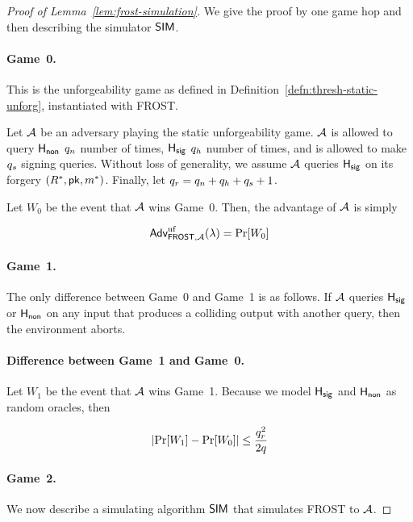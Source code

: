 \begin{proof}[Proof of Lemma~\ref{lem:frost-simulation}]
  We give the proof by one game hop and then describing the simulator $\mathsf{SIM}$.

  \paragraph{Game~0.}
  This is the unforgeability game as defined in Definition~\ref{defn:thresh-static-unforg},
  instantiated with FROST.

  Let $\mathcal{A}$ be an adversary playing the static unforgeability game.
  $\mathcal{A}$ is allowed to query $\mathsf{H_{non}}$ $q_n$ number of times,
  $\mathsf{H_{sig}}$ $q_h$ number of times,
  and is allowed to make $q_s$ signing queries.
  Without loss of generality, we assume $\mathcal{A}$ queries $\mathsf{H_{sig}}$ on its forgery $(R^*, \mathsf{pk}, m^*)$.
  Finally, let $q_r = q_n + q_h + q_s + 1$.

  Let $W_0$ be the event that $\mathcal{A}$ wins Game~0.
  Then, the advantage of $\mathcal{A}$ is simply

  \begin{equation} \label{eq:game0-frost}
    \textsf{\upshape Adv}^{\textrm{\upshape uf}}_{\mathsf{FROST}, \mathcal{A}}(\lambda) = \Pr[W_0]
  \end{equation}

  \paragraph{Game~1.}
  The only difference between Game~0 and Game~1 is as follows.
  If $\mathcal{A}$ queries $\mathsf{H_{sig}}$ or $\mathsf{H_{non}}$ on any input that produces a colliding output with another query,
  then the environment aborts.

  \paragraph{Difference between Game~1 and Game~0.}
  Let $W_1$ be the event that $\mathcal{A}$ wins Game~1.
  Because we model $\mathsf{H_{sig}}$ and $\mathsf{H_{non}}$ as random oracles,
  then

  \begin{equation} \label{eq:game1-frost}
    \lvert \Pr[W_1] - \Pr[W_0] \rvert \leq \frac{q_r^2}{2q}
  \end{equation}

  \paragraph{Game~2.}
  We now describe a simulating algorithm $\mathsf{SIM}$ that simulates FROST to  $\mathcal{A}$.


\end{proof}
